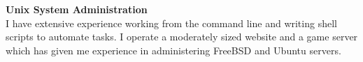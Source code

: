 \textbf{Unix System Administration} \\
I have extensive experience working from the command line and writing shell
scripts to automate tasks. I operate a moderately sized website and a game
server which has given me experience in administering FreeBSD and Ubuntu
servers.

